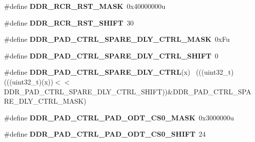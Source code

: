 \begin{DoxyCompactItemize}
\item 
\hypertarget{group___d_d_r___register___masks_gadb8cace14bc76c718f3b215a38c91e98}{}\#define {\bfseries D\+D\+R\+\_\+\+R\+C\+R\+\_\+\+R\+S\+T\+\_\+\+M\+A\+S\+K}~0x40000000u\label{group___d_d_r___register___masks_gadb8cace14bc76c718f3b215a38c91e98}

\item 
\hypertarget{group___d_d_r___register___masks_ga2944714df0d0d60b0d487bc1f46ff8fa}{}\#define {\bfseries D\+D\+R\+\_\+\+R\+C\+R\+\_\+\+R\+S\+T\+\_\+\+S\+H\+I\+F\+T}~30\label{group___d_d_r___register___masks_ga2944714df0d0d60b0d487bc1f46ff8fa}

\item 
\hypertarget{group___d_d_r___register___masks_gab5a0950bfe42621f42e68e983486eda1}{}\#define {\bfseries D\+D\+R\+\_\+\+P\+A\+D\+\_\+\+C\+T\+R\+L\+\_\+\+S\+P\+A\+R\+E\+\_\+\+D\+L\+Y\+\_\+\+C\+T\+R\+L\+\_\+\+M\+A\+S\+K}~0x\+Fu\label{group___d_d_r___register___masks_gab5a0950bfe42621f42e68e983486eda1}

\item 
\hypertarget{group___d_d_r___register___masks_gad782e079eb2620d908f9895d98948772}{}\#define {\bfseries D\+D\+R\+\_\+\+P\+A\+D\+\_\+\+C\+T\+R\+L\+\_\+\+S\+P\+A\+R\+E\+\_\+\+D\+L\+Y\+\_\+\+C\+T\+R\+L\+\_\+\+S\+H\+I\+F\+T}~0\label{group___d_d_r___register___masks_gad782e079eb2620d908f9895d98948772}

\item 
\hypertarget{group___d_d_r___register___masks_ga02cad0035d9ae30bbd731eed6bbb961f}{}\#define {\bfseries D\+D\+R\+\_\+\+P\+A\+D\+\_\+\+C\+T\+R\+L\+\_\+\+S\+P\+A\+R\+E\+\_\+\+D\+L\+Y\+\_\+\+C\+T\+R\+L}(x)                  ~(((uint32\+\_\+t)(((uint32\+\_\+t)(x))$<$$<$D\+D\+R\+\_\+\+P\+A\+D\+\_\+\+C\+T\+R\+L\+\_\+\+S\+P\+A\+R\+E\+\_\+\+D\+L\+Y\+\_\+\+C\+T\+R\+L\+\_\+\+S\+H\+I\+F\+T))\&D\+D\+R\+\_\+\+P\+A\+D\+\_\+\+C\+T\+R\+L\+\_\+\+S\+P\+A\+R\+E\+\_\+\+D\+L\+Y\+\_\+\+C\+T\+R\+L\+\_\+\+M\+A\+S\+K)\label{group___d_d_r___register___masks_ga02cad0035d9ae30bbd731eed6bbb961f}

\item 
\hypertarget{group___d_d_r___register___masks_ga1a3a241ffa833cae83124435c6385832}{}\#define {\bfseries D\+D\+R\+\_\+\+P\+A\+D\+\_\+\+C\+T\+R\+L\+\_\+\+P\+A\+D\+\_\+\+O\+D\+T\+\_\+\+C\+S0\+\_\+\+M\+A\+S\+K}~0x3000000u\label{group___d_d_r___register___masks_ga1a3a241ffa833cae83124435c6385832}

\item 
\hypertarget{group___d_d_r___register___masks_ga1f5d8c9d2414a61efb8236461ae5dfbd}{}\#define {\bfseries D\+D\+R\+\_\+\+P\+A\+D\+\_\+\+C\+T\+R\+L\+\_\+\+P\+A\+D\+\_\+\+O\+D\+T\+\_\+\+C\+S0\+\_\+\+S\+H\+I\+F\+T}~24\label{group___d_d_r___register___masks_ga1f5d8c9d2414a61efb8236461ae5dfbd}


\end{DoxyCompactItemize}
